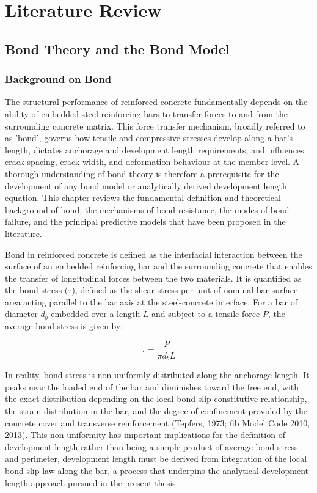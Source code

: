 \chapter{Literature Review}

\section{Bond Theory and the Bond Model}

\subsection{Background on Bond}
The structural performance of reinforced concrete fundamentally depends on the ability of embedded steel reinforcing bars to transfer forces to and from the surrounding concrete matrix. This force transfer mechanism, broadly referred to as 'bond', governs how tensile and compressive stresses develop along a bar's length, dictates anchorage and development length requirements, and influences crack spacing, crack width, and deformation behaviour at the member level. A thorough understanding of bond theory is therefore a prerequisite for the development of any bond model or analytically derived development length equation. This chapter reviews the fundamental definition and theoretical background of bond, the mechanisms of bond resistance, the modes of bond failure, and the principal predictive models that have been proposed in the literature.

Bond in reinforced concrete is defined as the interfacial interaction between the surface of an embedded reinforcing bar and the surrounding concrete that enables the transfer of longitudinal forces between the two materials. It is quantified as the bond stress ($\tau$), defined as the shear stress per unit of nominal bar surface area acting parallel to the bar axis at the steel-concrete interface. For a bar of diameter $d_b$ embedded over a length $L$ and subject to a tensile force $P$, the average bond stress is given by:

\begin{equation}
\tau = \frac{P}{\pi d_b L}
\end{equation}

In reality, bond stress is non-uniformly distributed along the anchorage length. It peaks near the loaded end of the bar and diminishes toward the free end, with the exact distribution depending on the local bond-slip constitutive relationship, the strain distribution in the bar, and the degree of confinement provided by the concrete cover and transverse reinforcement (Tepfers, 1973; fib Model Code 2010, 2013). This non-uniformity has important implications for the definition of development length rather than being a simple product of average bond stress and perimeter, development length must be derived from integration of the local bond-slip law along the bar, a process that underpins the analytical development length approach pursued in the present thesis.

